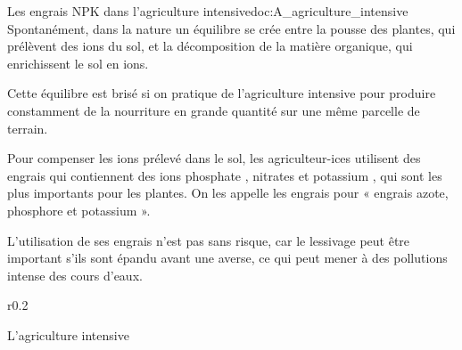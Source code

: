 \begin{doc}{Les engrais NPK dans l'agriculture intensive}{doc:A_agriculture_intensive}
  Spontanément, dans la nature un équilibre se crée entre la pousse des plantes, qui prélèvent des ions du sol, et la décomposition de la matière organique, qui enrichissent le sol en ions.

  Cette équilibre est brisé si on pratique de l'agriculture intensive pour produire constamment de la nourriture en grande quantité sur une même parcelle de terrain. 
  \begin{importants}
    Pour compenser les ions prélevé dans le sol, les agriculteur-ices utilisent des engrais qui contiennent des ions phosphate \ionPhosphate, nitrates \nitrate et potassium \ionPotassium, qui sont les plus importants pour les plantes.
    On les appelle les engrais  pour « engrais azote, phosphore et potassium ».
  \end{importants}
  
  L'utilisation de ses engrais n'est pas sans risque, car le lessivage peut être important s'ils sont épandu avant une averse, ce qui peut mener à des pollutions intense des cours d'eaux.

  \vspace*{-12pt}
  \begin{wrapfigure}[2]{r}{0.2\linewidth}
  \end{wrapfigure}
  \strut
  
  \begin{importants}
    L'agriculture intensive 
  \end{importants}
  
  \begin{center}
  \end{center}


\end{doc}
